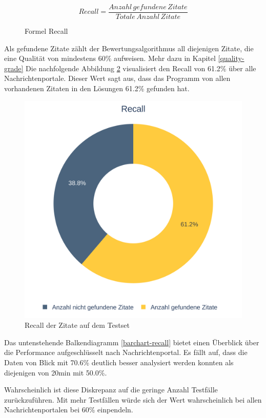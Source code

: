 \begin{figure}[H]
    \begin{equation}
        Recall = \frac{Anzahl \, gefundene \, Zitate}{Totale \, Anzahl \, Zitate}
    \end{equation}
    \caption{Formel Recall}
    \label{recall-formula}
\end{figure}

Als gefundene Zitate zählt der Bewertungsalgorithmus all diejenigen Zitate, die eine Qualität von
mindestens 60\% aufweisen. Mehr dazu in Kapitel \ref{quality-grade}
Die nachfolgende Abbildung \ref{piechart-recall} visualisiert den Recall von 61.2\% über
alle Nachrichtenportale.
Dieser Wert sagt aus, dass das Programm von allen vorhandenen Zitaten in den Lösungen
61.2\% gefunden hat.

\begin{figure}[H]
	\begin{center}
        \centering
		\includegraphics[width=0.75\linewidth]{./images/recall.png}
	\end{center}
	\caption{Recall der Zitate auf dem Testset}
	\label{piechart-recall}
\end{figure}

Das untenstehende Balkendiagramm \ref{barchart-recall} bietet einen Überblick
über die Performance aufgeschlüsselt nach Nachrichtenportal. Es fällt auf, dass
die Daten von Blick mit 70.6\% deutlich besser analysiert werden konnten als diejenigen
von 20min mit 50.0\%.

Wahrscheinlich ist diese Diskrepanz auf die geringe Anzahl Testfälle zurückzuführen.
Mit mehr Testfällen würde sich der Wert wahrscheinlich bei allen Nachrichtenportalen bei
60\% einpendeln.

